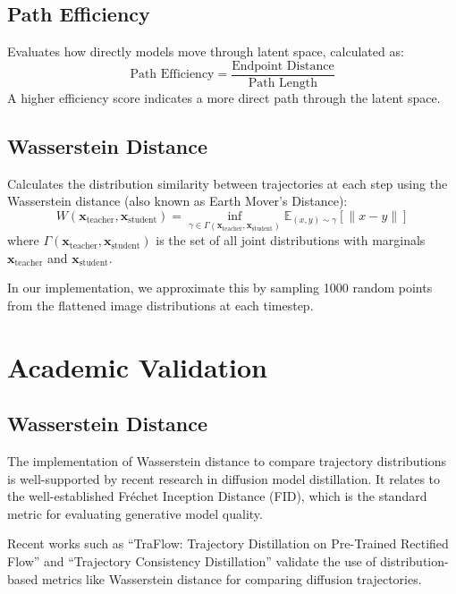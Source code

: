 \documentclass{article}
\begin{document}
\subsection{Path Efficiency}
Evaluates how directly models move through latent space, calculated as:
\begin{equation}
\text{Path Efficiency} = \frac{\text{Endpoint Distance}}{\text{Path Length}}
\end{equation}
A higher efficiency score indicates a more direct path through the latent space.

\subsection{Wasserstein Distance}
Calculates the distribution similarity between trajectories at each step using the Wasserstein distance (also known as Earth Mover's Distance):
\begin{equation}
W(\mathbf{x}_{\text{teacher}}, \mathbf{x}_{\text{student}}) = \inf_{\gamma \in \Gamma(\mathbf{x}_{\text{teacher}}, \mathbf{x}_{\text{student}})} \mathbb{E}_{(x,y) \sim \gamma}[\|x - y\|]
\end{equation}
where $\Gamma(\mathbf{x}_{\text{teacher}}, \mathbf{x}_{\text{student}})$ is the set of all joint distributions with marginals $\mathbf{x}_{\text{teacher}}$ and $\mathbf{x}_{\text{student}}$.

In our implementation, we approximate this by sampling 1000 random points from the flattened image distributions at each timestep.

\section{Academic Validation}

\subsection{Wasserstein Distance}
The implementation of Wasserstein distance to compare trajectory distributions is well-supported by recent research in diffusion model distillation. It relates to the well-established Fréchet Inception Distance (FID), which is the standard metric for evaluating generative model quality.

Recent works such as ``TraFlow: Trajectory Distillation on Pre-Trained Rectified Flow'' \cite{wu2024traflow} and ``Trajectory Consistency Distillation'' \cite{zheng2024trajectory} validate the use of distribution-based metrics like Wasserstein distance for comparing diffusion trajectories.
\end{document}
